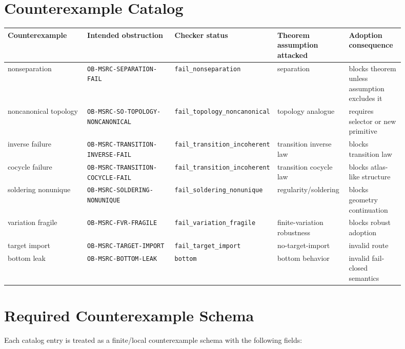 \documentclass[11pt]{article}
\begin{document}
\section{Counterexample Catalog}

\begin{longtable}{|p{0.20\linewidth}|p{0.22\linewidth}|p{0.16\linewidth}|p{0.18\linewidth}|p{0.14\linewidth}|}
\hline
\textbf{Counterexample} & \textbf{Intended obstruction} & \textbf{Checker status} & \textbf{Theorem assumption attacked} & \textbf{Adoption consequence} \\
\hline
nonseparation & \texttt{OB-MSRC-SEPARATION-FAIL} & \texttt{fail\_nonseparation} & separation & blocks theorem unless assumption excludes it \\
\hline
noncanonical topology & \texttt{OB-MSRC-SO-TOPOLOGY-NONCANONICAL} & \texttt{fail\_topology\_noncanonical} & topology analogue & requires selector or new primitive \\
\hline
inverse failure & \texttt{OB-MSRC-TRANSITION-INVERSE-FAIL} & \texttt{fail\_transition\_incoherent} & transition inverse law & blocks transition law \\
\hline
cocycle failure & \texttt{OB-MSRC-TRANSITION-COCYCLE-FAIL} & \texttt{fail\_transition\_incoherent} & transition cocycle law & blocks atlas-like structure \\
\hline
soldering nonunique & \texttt{OB-MSRC-SOLDERING-NONUNIQUE} & \texttt{fail\_soldering\_nonunique} & regularity/soldering & blocks geometry continuation \\
\hline
variation fragile & \texttt{OB-MSRC-FVR-FRAGILE} & \texttt{fail\_variation\_fragile} & finite-variation robustness & blocks robust adoption \\
\hline
target import & \texttt{OB-MSRC-TARGET-IMPORT} & \texttt{fail\_target\_import} & no-target-import & invalid route \\
\hline
bottom leak & \texttt{OB-MSRC-BOTTOM-LEAK} & \texttt{bottom} & bottom behavior & invalid fail-closed semantics \\
\hline
\end{longtable}

\section{Required Counterexample Schema}

Each catalog entry is treated as a finite/local counterexample schema with the
following fields:
\end{document}
